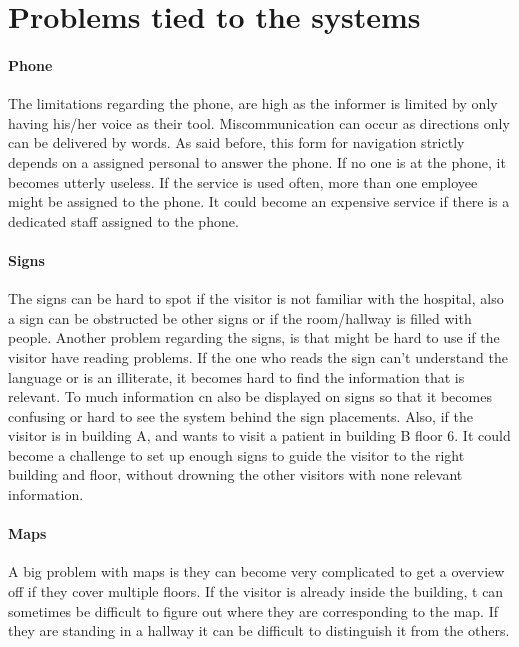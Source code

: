 \section{Problems tied to the systems} %
\label{sec:Problems_tied_to_the_systems}

\paragraph{Phone}
The limitations regarding the phone, are high as the informer is limited by only having his/her voice as their tool. Miscommunication can occur as directions only can be delivered by words. As said before, this form for navigation strictly depends on a assigned personal to answer the phone. If no one is at the phone, it becomes utterly useless.
If the service is used often, more than one employee might be assigned to the phone. It could become an expensive service if there is a dedicated staff assigned to the phone. 

\paragraph{Signs}
The signs can be hard to spot if the  visitor is not familiar with the hospital, also a sign can be obstructed be other signs or if the room/hallway is filled with people. Another problem regarding the signs, is that might be hard to use if the visitor have reading problems. If the one who reads the sign can't understand the language or is an illiterate, it becomes hard to find the information that is relevant. To much information cn also be displayed on signs so that it becomes confusing or hard to see the system behind the sign placements.
Also, if the visitor is in building A, and wants to visit a patient in building B floor 6. It could become a challenge to set up enough signs to guide the visitor to the right building and floor, without drowning the other visitors with none relevant information.

\paragraph{Maps}
A big problem with maps is they can become very complicated to get a overview off if they cover multiple floors\cite{map_confusing}. If the visitor is already inside the building, t can sometimes be difficult to figure out where they are corresponding to the map. If they are standing in a hallway it can be difficult to distinguish it from the others. 


